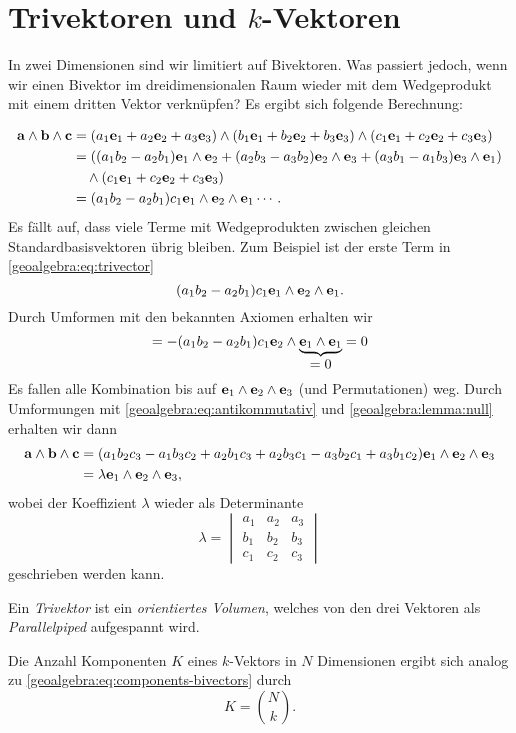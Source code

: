 \section{Trivektoren und $k$-Vektoren}
\label{geoalgebra:section:trivectors-n-vectors}
In zwei Dimensionen sind wir limitiert auf Bivektoren. Was passiert jedoch, wenn wir einen Bivektor
im dreidimensionalen Raum wieder mit dem Wedgeprodukt mit einem dritten Vektor verknüpfen?
Es ergibt sich folgende Berechnung:
{
\begin{align} 
\mathbf{a} \wedge \mathbf{b} \wedge \mathbf{c}
&=
(a_1 \mathbf{e}_1 + a_2 \mathbf{e}_2 + a_3 \mathbf{e}_3) \wedge (b_1 \mathbf{e}_1 + b_2 \mathbf{e}_2 + b_3 \mathbf{e}_3) \wedge (c_1 \mathbf{e}_1 + c_2 \mathbf{e}_2 + c_3 \mathbf{e}_3)
\notag
\\
&=
((a_1 b_2 - a_2 b_1) \mathbf{e}_1 \wedge \mathbf{e}_2 +(a_2 b_3 - a_3 b_2) \mathbf{e}_2 \wedge \mathbf{e}_3 +(a_3 b_1 - a_1 b_3) \mathbf{e}_3 \wedge \mathbf{e}_1)
\notag
\\
&\quad\wedge (c_1 \mathbf{e}_1 + c_2 \mathbf{e}_2 + c_3 \mathbf{e}_3)
\notag
\\
&=
(a_1 b_2 - a_2 b_1) c_1 \mathbf{e}_1 \wedge \mathbf{e}_2 \wedge \mathbf{e}_1 \cdots.
\label{geoalgebra:eq:trivector}
\end{align}
Es fällt auf, dass viele Terme mit Wedgeprodukten zwischen gleichen Standardbasisvektoren übrig bleiben. Zum Beispiel ist der erste Term in \eqref{geoalgebra:eq:trivector}
\begin{equation*}
(a_1 b_2 - a_2 b_1) c_1 \mathbf{e}_1 \wedge \mathbf{e}_2 \wedge \mathbf{e}_1.
\end{equation*}
Durch Umformen mit den bekannten Axiomen erhalten wir
\begin{equation*}
=-(a_1 b_2 - a_2 b_1) c_1 \mathbf{e}_2 \wedge \underbrace{\mathbf{e}_1 \wedge \mathbf{e}_1}_{\displaystyle =0} = 0
\end{equation*}
Es fallen alle Kombination bis auf $\mathbf{e}_1 \wedge \mathbf{e}_2 \wedge \mathbf{e}_3$ (und Permutationen) weg.
Durch Umformungen mit
\eqref{geoalgebra:eq:antikommutativ} und
\eqref{geoalgebra:lemma:null}
erhalten wir dann
\begin{align*}
  \mathbf{a} \wedge \mathbf{b} \wedge \mathbf{c} &= (a_1 b_2 c_3 - a_1 b_3 c_2 + a_2 b_1 c_3 + a_2 b_3 c_1 - a_3 b_2 c_1 + a_3 b_1 c_2) \mathbf{e}_1 \wedge \mathbf{e}_2 \wedge \mathbf{e}_3 \\
  &= \lambda \mathbf{e}_1 \wedge \mathbf{e}_2 \wedge \mathbf{e}_3,
\end{align*}
wobei der Koeffizient $\lambda$ wieder als Determinante
%
\begin{equation*}
\lambda = \begin{vmatrix} a_1 & a_2 & a_3 \\ b_1 & b_2 & b_3 \\ c_1 & c_2 & c_3 \end{vmatrix}
\end{equation*}
geschrieben werden kann.

Ein \emph{Trivektor} ist ein \emph{orientiertes Volumen}, welches von den drei Vektoren als \emph{Parallelpiped} aufgespannt wird.
%
%
%

Die Anzahl Komponenten $K$ eines $k$-Vektors in $N$ Dimensionen ergibt sich analog zu \eqref{geoalgebra:eq:components-bivectors} durch
\begin{equation*}
  K = \binom{N}{k}.
\end{equation*}
}
